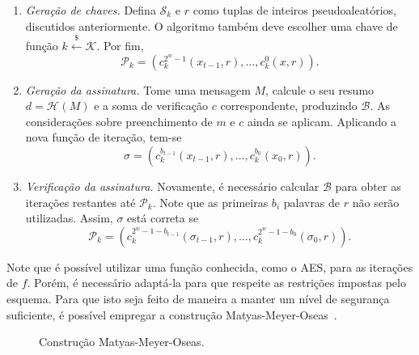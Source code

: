 \documentclass{ufsctex/ufsctex}
\newcommand{\pk}{\mathcal{P}_k}
\newcommand{\sk}{\mathcal{S}_k}
\newcommand{\hash}[2][]{\mathcal{H}^{#1} (#2)}
\newcommand{\random}{\stackrel{\$}{\longleftarrow}}
\begin{document}
\begin{enumerate}

  \item[] \emph{Geração de chaves.} Defina $\sk{}$ e $r$ como tuplas de
      inteiros pseudoaleatórios, discutidos anteriormente. O algoritmo também
        deve escolher uma chave de função $k \random{} \mathcal{K}$. Por fim,
        \begin{equation}
          \pk{} = (c^{2^w-1}_{k}(x_{t-1}, r), \dots, c^{0}_{k}(x, r)).
        \end{equation}

  \item[] \emph{Geração da assinatura.} Tome uma mensagem $M$, calcule o seu
      resumo $d = \hash{M}$ e a soma de verificação $c$ correspondente,
        produzindo $\mathcal{B}$. As considerações sobre preenchimento de $m$ e
        $c$ ainda se aplicam. Aplicando a nova função de iteração, tem-se
        \begin{equation}
          \sigma = (c^{b_{t - 1}}_{k}(x_{t-1}, r),
            \dots, c^{b_{0}}_{k}(x_{0}, r)).
        \end{equation}

  \item[] \emph{Verificação da assinatura.} Novamente, é necessário calcular
      $\mathcal{B}$ para obter as iterações restantes até $\pk{}$. Note que as
        primeiras $b_i$ palavras de $r$ não serão utilizadas. Assim, $\sigma$
        está correta se
        \begin{equation}
          \pk{} = (c^{2^{w} - 1 - b_{t - 1}}_{k}(\sigma_{t-1}, r),
            \dots, c^{2^{w} - 1 - b_{0}}_{k}(\sigma_{0}, r)).
        \end{equation}

\end{enumerate}

Note que é possível utilizar uma função conhecida, como o AES, para as
iterações de $f$. Porém, é necessário adaptá-la para que respeite as restrições
impostas pelo esquema. Para que isto seja feito de maneira a manter um nível de
segurança suficiente, é possível empregar a construção
Matyas-Meyer-Oseas~\cite[Algoritmo 9.41]{Menezes:book:1996}.

\begin{figure}
  \centering
  \caption{Construção Matyas-Meyer-Oseas.}\label{fig:6}
\end{figure}
\end{document}
